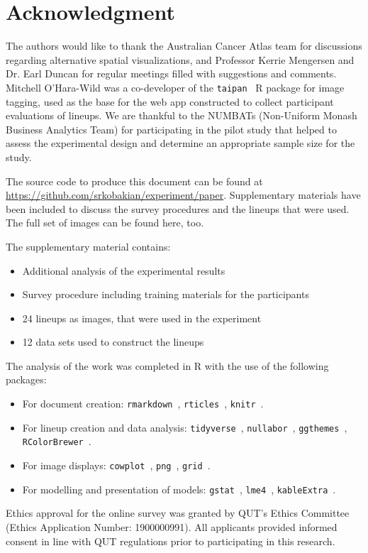 \documentclass[journal]{vgtc}                     %
\begin{document}
\hypertarget{acknowledgment}{%
\section{Acknowledgment}\label{acknowledgment}}

The authors would like to thank the Australian Cancer Atlas team for discussions regarding alternative spatial visualizations, and Professor Kerrie Mengersen and Dr. Earl Duncan for regular meetings filled with suggestions and comments. Mitchell O'Hara-Wild was a co-developer of the \texttt{taipan}~\cite{taipan} R package for image tagging, used as the base for the web app constructed to collect participant evaluations of lineups. We are thankful to the NUMBATs (Non-Uniform Monash Business Analytics Team) for participating in the pilot study that helped to assess the experimental design and determine an appropriate sample size for the study.

The source code to produce this document can be found at \url{https://github.com/srkobakian/experiment/paper}.
Supplementary materials have been included to discuss the survey procedures and the lineups that were used.
The full set of images can be found here, too.

The supplementary material contains:

\begin{itemize} \itemsep 0in
\item
  Additional analysis of the experimental results
\item
  Survey procedure including training materials for the participants
\item
  24 lineups as images, that were used in the experiment
\item
  12 data sets used to construct the lineups
\end{itemize}

The analysis of the work was completed in R  \cite{RCore} with the use of the following packages:

\begin{itemize} \itemsep 0in
\item
  For document creation: \texttt{rmarkdown}~\cite{rmarkdown}, \texttt{rticles}~\cite{rticles}, \texttt{knitr}~\cite{knitr}.
\item
  For lineup creation and data analysis: \texttt{tidyverse}~\cite{tidyverse}, \texttt{nullabor}~\cite{nullabor}, \texttt{ggthemes}~\cite{ggthemes}, \texttt{RColorBrewer}~\cite{RColorBrewer}.
\item
  For image displays: \texttt{cowplot}~\cite{cowplot}, \texttt{png}~\cite{png}, \texttt{grid}~\cite{grid}.
\item
  For modelling and presentation of models: \texttt{gstat}~\cite{gstat}, \texttt{lme4}~\cite{lme4}, \texttt{kableExtra}~\cite{kableExtra}.
\end{itemize}

Ethics approval for the online survey was granted by QUT's Ethics Committee (Ethics Application Number: 1900000991). All applicants provided informed consent in line with QUT regulations prior to participating in this research.



\end{document}
